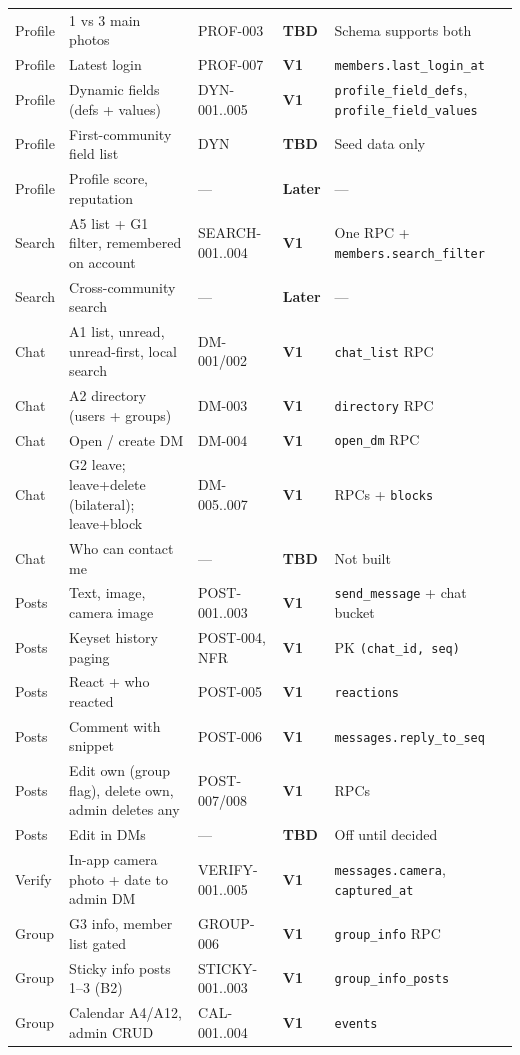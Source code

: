 \documentclass[11pt,a4paper]{article}
\newcommand{\vone}{\textcolor{p0}{\textbf{V1}}}
\newcommand{\later}{\textcolor{p1}{\textbf{Later}}}
\newcommand{\tbd}{\textcolor{tbd}{\textbf{TBD}}}
\newcommand{\code}[1]{\texttt{\small #1}}
\begin{document}
{\begin{longtable}{L{1.9cm} L{5.2cm} L{2.2cm} L{1.1cm} L{4.6cm}}
Profile & 1 vs 3 main photos & PROF-003 & \tbd & Schema supports both\\
Profile & Latest login & PROF-007 & \vone & \code{members.last\_login\_at}\\
Profile & Dynamic fields (defs + values) & DYN-001..005 & \vone & \code{profile\_field\_defs}, \code{profile\_field\_values}\\
Profile & First-community field list & DYN & \tbd & Seed data only\\
Profile & Profile score, reputation & --- & \later & ---\\
Search & A5 list + G1 filter, remembered on account & SEARCH-001..004 & \vone & One RPC + \code{members.search\_filter}\\
Search & Cross-community search & --- & \later & ---\\
Chat & A1 list, unread, unread-first, local search & DM-001/002 & \vone & \code{chat\_list} RPC\\
Chat & A2 directory (users + groups) & DM-003 & \vone & \code{directory} RPC\\
Chat & Open / create DM & DM-004 & \vone & \code{open\_dm} RPC\\
Chat & G2 leave; leave+delete (bilateral); leave+block & DM-005..007 & \vone & RPCs + \code{blocks}\\
Chat & Who can contact me & --- & \tbd & Not built\\
Posts & Text, image, camera image & POST-001..003 & \vone & \code{send\_message} + chat bucket\\
Posts & Keyset history paging & POST-004, NFR & \vone & PK \code{(chat\_id, seq)}\\
Posts & React + who reacted & POST-005 & \vone & \code{reactions}\\
Posts & Comment with snippet & POST-006 & \vone & \code{messages.reply\_to\_seq}\\
Posts & Edit own (group flag), delete own, admin deletes any & POST-007/008 & \vone & RPCs\\
Posts & Edit in DMs & --- & \tbd & Off until decided\\
Verify & In-app camera photo + date to admin DM & VERIFY-001..005 & \vone & \code{messages.camera}, \code{captured\_at}\\
Group & G3 info, member list gated & GROUP-006 & \vone & \code{group\_info} RPC\\
Group & Sticky info posts 1--3 (B2) & STICKY-001..003 & \vone & \code{group\_info\_posts}\\
Group & Calendar A4/A12, admin CRUD & CAL-001..004 & \vone & \code{events}\\

\end{longtable}}
\end{document}

